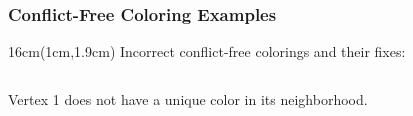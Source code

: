 \documentclass[xcolor=dvipsnames,aspectratio=1610]{beamer}
\newcommand{\exampleheight}{1.9cm}
\newcommand{\examplewidth}{16cm}
\begin{document}
\begin{frame}
\begin{columns}
    \end{columns}

  \end{frame}

  \begin{frame}
    \frametitle{Conflict-Free Coloring Examples}

    \begin{textblock*}{\examplewidth}(1cm,\exampleheight) %
      Incorrect conflict-free colorings and their fixes:
    \end{textblock*}

    \vspace{0.5cm}

    \pause

    \begin{columns}
      \begin{column}{0.33333\textwidth}


        \centering
        Vertex 1 does not have a unique color in its neighborhood.
      \end{column}

      \pause
      \pause

      \begin{column}{0.33333\textwidth}



\end{column}
\end{columns}
\end{frame}
\end{document}

